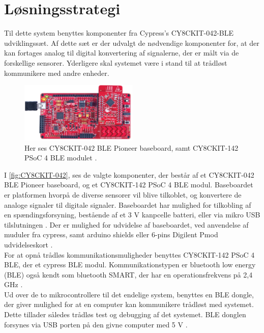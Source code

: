 \section{Løsningsstrategi}
Til dette system benyttes komponenter fra Cypress's CY8CKIT-042-BLE udviklingssæt. 
Af dette sæt er der udvalgt de nødvendige komponenter for, at der kan fortages analog til digital konvertering af signalerne, der er målt via de forskellige sensorer. Yderligere skal systemet være i stand til at trådløst kommunikere med andre enheder.   

\begin{figure}[H]
\centering
\includegraphics[width=0.5\textwidth]{figures/CY8CKIT-042.png}
\caption{Her ses CY8CKIT-042 BLE Pioneer baseboard, samt CY8CKIT-142 PSoC 4 BLE modulet \citep{cypresspsoc2015}.}
\label{fig:CY8CKIT-042}
\end{figure}

I \autoref{fig:CY8CKIT-042}, ses de valgte komponenter, der består af et CY8CKIT-042 BLE Pioneer baseboard, og et CY8CKIT-142 PSoC 4 BLE modul. Baseboardet er platformen hvorpå de diverse sensorer vil blive tilkoblet, og konvertere de analoge signaler til digitale signaler. Baseboardet har mulighed for tilkobling af en spændingsforsyning, bestående af et 3 V kanpcelle batteri, eller via mikro USB tilslutningen \citep{cypressguide2014}. Der er mulighed for udvidelse af baseboardet, ved anvendelse af muduler fra cypress, samt arduino shields eller 6-pins Digilent Pmod udvidelseskort \citep{cypressguide2014}. 
\\

For at opnå trådløs kommunikationsmuligheder benyttes CY8CKIT-142 PSoC 4 BLE, der et cypress BLE modul. Kommunikationstypen er bluetooth low energy (BLE) også kendt som bluetooth SMART, der har en operationsfrekvens på 2,4 GHz \citep{cypressguide2014}. 
\\

Ud over de to mikrocontrollere til det endelige system, benyttes en BLE dongle, der giver mulighed for at en computer kan kommunikere trådløst med systemet. Dette tillader således trådløs test og debugging af det systemet. BLE donglen forsynes via USB porten på den givne computer med 5 V \citep{cypressguide2014}. 
\\

